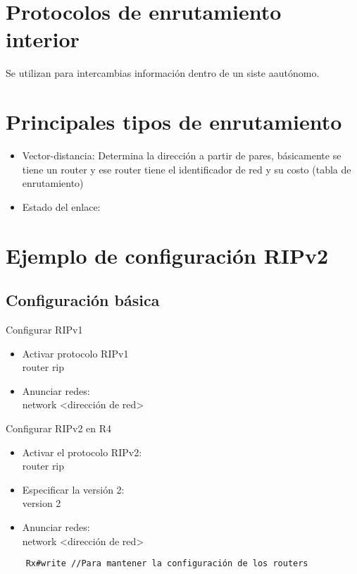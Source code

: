 \section{Protocolos de enrutamiento interior}
Se utilizan para intercambias información dentro de un siste aautónomo.

\section{Principales tipos de enrutamiento}

\begin{itemize}
    \item {Vector-distancia: Determina la dirección a partir de pares, básicamente se tiene un router y ese router tiene el identificador de red y su costo (tabla de enrutamiento)}
    \item {Estado del enlace: }
\end{itemize}

\section{Ejemplo de configuración RIPv2}

\subsection{Configuración básica}
Configurar RIPv1
\begin{itemize}
    \item {Activar protocolo RIPv1 \\ router rip}
    \item {Anunciar redes: \\ network <dirección de red> }
\end{itemize}

Configurar RIPv2 en R4
\begin{itemize}
    \item {Activar el protocolo RIPv2: \\ router rip}
    \item {Especificar la versión 2: \\ version 2}
    \item {Anunciar redes: \\ network <dirección de red>}
\end{itemize}

\begin{lstlisting}
    Rx#write //Para mantener la configuración de los routers
\end{lstlisting}


